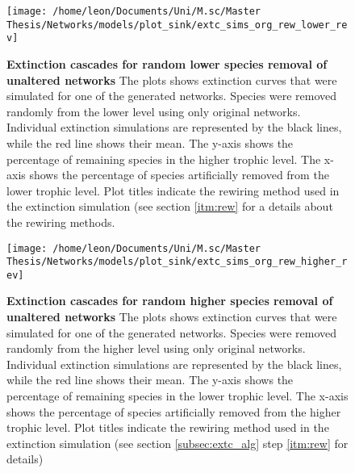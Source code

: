 \documentclass[12pt,a4paper]{article}
\begin{document}
\begin{figure}[H]
	 \centering
	 \texttt{[image: /home/leon/Documents/Uni/M.sc/Master Thesis/Networks/models/plot\_sink/extc\_sims\_org\_rew\_lower\_rev]}
	 \captionsetup{width = \textwidth}
	 \caption[Extinction cascades for random lower species removal of unaltered networks]{\textbf{Extinction cascades for random lower species removal of unaltered networks} The plots shows extinction curves that were simulated for one of the generated networks. Species were removed randomly from the lower level using only original networks. Individual extinction simulations are represented by the black lines, while the red line shows their mean. The y-axis shows the percentage of remaining species in the higher trophic level. The x-axis shows the percentage of species artificially removed from the lower trophic level. Plot titles indicate the rewiring method used in the extinction simulation (see section \ref{itm:rew} for a details about the rewiring methods.}
	 \label{fig:extc_org_rew_lower}
\end{figure}


\begin{figure}[H]
	 \centering
	 \texttt{[image: /home/leon/Documents/Uni/M.sc/Master Thesis/Networks/models/plot\_sink/extc\_sims\_org\_rew\_higher\_rev]}
	 \captionsetup{width = \textwidth}
	 \caption[Extinction cascades for random higher species removal of unaltered networks]{\textbf{Extinction cascades for random higher species removal of unaltered networks} The plots shows extinction curves that were simulated for one of the generated networks. Species were removed randomly from the higher level using only original networks. Individual extinction simulations are represented by the black lines, while the red line shows their mean. The y-axis shows the percentage of remaining species in the lower trophic level. The x-axis shows the percentage of species artificially removed from the higher trophic level. Plot titles indicate the rewiring method used in the extinction simulation (see section \ref{subsec:extc_alg} step \ref{itm:rew} for details)}
	 \label{fig:extc_org_rew_higher}
\end{figure}
\end{document}

